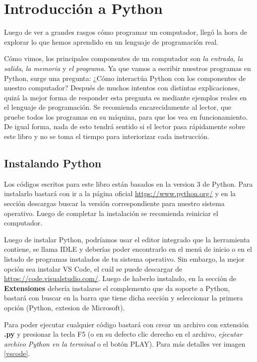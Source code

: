 \chapter{Introducción a Python}

Luego de ver a grandes rasgos cómo programar un computador, llegó la hora de explorar lo que hemos aprendido en un lenguaje de programación real. 

Cómo vimos, los principales componentes de un computador son \emph{la entrada}, \emph{la salida}, \emph{la memoria} y \emph{el programa}. Ya que vamos a escribir nuestros programas en Python, surge una pregunta: ¿Cómo interactúa Python con los componentes de nuestro computador? Después de muchos intentos con distintas explicaciones, quizá la mejor forma de responder esta pregunta es mediante ejemplos reales en el lenguaje de programación. Se recomienda encarecidamente al lector, que pruebe todos los programas en su máquina, para que los vea en funcionamiento. De igual forma, nada de esto tendrá sentido si el lector pasa rápidamente sobre este libro y no se toma el tiempo para interiorizar cada instrucción.

\section{Instalando Python}

Los códigos escritos para este libro están basados en la version 3 de Python. Para instalarlo bastará con ir a la página oficial \url{https://www.python.org/} y en la sección descargas buscar la versión correspondiente para nuestro sistema operativo. Luego de completar la instalación se recomienda reiniciar el computador.

Luego de instalar Python, podríamos usar el editor integrado que la herramienta contiene, se llama IDLE y deberías poder encontrarlo en el menú de inicio o en el listado de programas instalados de tu sistema operativo. Sin embargo, la mejor opción sea instalar VS Code, el cuál se puede descargar de \url{https://code.visualstudio.com/}. Luego de haberlo instalado, en la sección de \textbf{Extensiones} debería instalarse el complemento que da soporte a Python, bastará con buscar en la barra que tiene dicha sección y seleccionar la primera opción (Python, extesion de Microsoft).

Para poder ejecutar cualquier código bastará con crear un archivo con extensión \textbf{.py} y presionar la tecla F5 (o en su defecto clic derecho en el archivo, \emph{ejecutar archivo Python en la terminal} o el botón PLAY). Para más detalles ver imagen \ref{vscode}.

